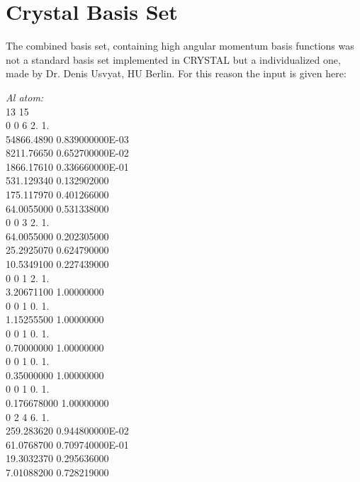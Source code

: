 \documentclass[11pt,DIV=13,BCOR=5mm,a4paper,headinclude]{scrbook}
\begin{document}
\def\thefigure{E.\arabic{figure}}
\def\thetable{E.\arabic{table}}
\section{Crystal Basis Set}\label{app_combined_basis}
The combined basis set, containing high angular momentum basis functions was not a standard basis set implemented in CRYSTAL but a individualized one, made by Dr. Denis Usvyat, HU Berlin.
For this reason the input is given here:
\\
\begin{spacing}{0.5}
{\tiny \textit{Al atom:}\\
13 15\\
0 0 6 2. 1.\\
       54866.4890         0.839000000E-03\\
       8211.76650         0.652700000E-02\\
       1866.17610         0.336660000E-01\\
       531.129340         0.132902000\\
       175.117970         0.401266000\\
       64.0055000         0.531338000\\
0 0 3 2. 1.\\
       64.0055000         0.202305000\\
       25.2925070         0.624790000\\
       10.5349100         0.227439000\\
0 0 1 2. 1.\\
       3.20671100          1.00000000\\
0 0 1 0. 1.\\
       1.15255500          1.00000000\\
0 0 1 0. 1.\\
       0.70000000          1.00000000\\
0 0 1 0. 1.\\
       0.35000000          1.00000000\\
0 0 1 0. 1.\\
      0.176678000          1.00000000\\
0 2 4 6. 1.\\
       259.283620         0.944800000E-02\\
       61.0768700         0.709740000E-01\\
       19.3032370         0.295636000\\
       7.01088200         0.728219000\\
}
\end{spacing}
\end{document}
